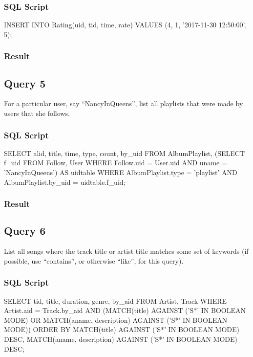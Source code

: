 \documentclass[letterpaper, 12pt]{report}
\begin{document}
	\subsubsection{SQL Script}
	\begin{spverbatim}
		INSERT INTO Rating(uid, tid, time, rate) VALUES (4, 1, '2017-11-30 12:50:00', 5);
	\end{spverbatim}
	\subsubsection{Result}
	
	\subsection{Query 5}
	For a particular user, say “NancyInQueens”, list all playlists that were made by users that she follows.
	\subsubsection{SQL Script}
	\begin{spverbatim}
		SELECT alid, title, time, type, count, by_uid FROM AlbumPlaylist,
		(SELECT f_uid FROM Follow, User
		WHERE Follow.uid = User.uid
		AND uname = 'NancyInQueens') AS uidtable
		WHERE AlbumPlaylist.type = 'playlist'
		AND AlbumPlaylist.by_uid = uidtable.f_uid;
	\end{spverbatim}
	\subsubsection{Result}
	
	\subsection{Query 6}
	List all songs where the track title or artist title matches some set of keywords (if possible, use
	``contains'', or otherwise ``like'', for this query).
	
	\subsubsection{SQL Script}
	\begin{spverbatim}
		SELECT tid, title, duration, genre, by_aid FROM Artist, Track 
		WHERE Artist.aid = Track.by_aid
		AND (MATCH(title)
		AGAINST ('S*' IN BOOLEAN MODE)
		OR MATCH(aname, description)
		AGAINST ('S*' IN BOOLEAN MODE))
		ORDER BY MATCH(title)
		AGAINST ('S*' IN BOOLEAN MODE) DESC,
		MATCH(aname, description)
		AGAINST ('S*' IN BOOLEAN MODE) DESC;
	\end{spverbatim}
\end{document}

